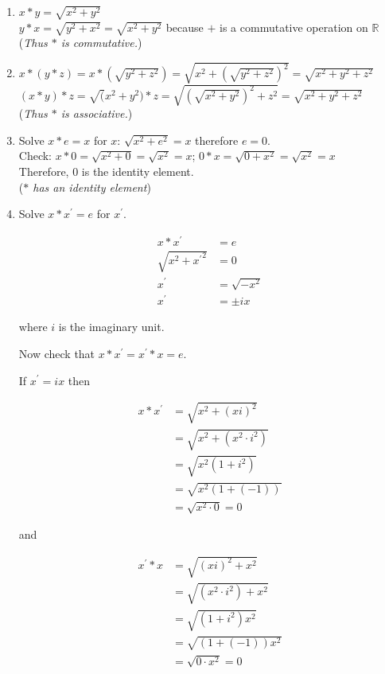 \documentclass[12pt]{article}
\begin{document}
\begin{flushleft}
\begin{enumerate}
\item $x *y = \sqrt{x^2 + y^2}$ \\
 $ y *x = \sqrt{y^2 + x^2} = \sqrt{x^2 + y^2}$ because $+$ is a commutative operation on $\mathbb{R}$ \\
(\textit{Thus $*$ is commutative.})

\item $x * \left( y * z \right) = x *\left(\sqrt{y^2 + z^2} \right) = \sqrt{x^2 + \left(\sqrt{y^2 + z^2} \right)^2} = \sqrt{x^2 + y^2 + z^2}$ \\
$\left( x * y \right) * z = \sqrt( x^2 + y^2 ) * z = \sqrt{\left( \sqrt{x ^2 + y^2} \right)^2 + z^2} = \sqrt{x^2 + y^2 + z^2}$ \\
(\textit{Thus $*$ is associative.})

\item Solve $x*e= x$ for $x$: $\sqrt{x^2 + e^2} = x$ therefore $e = 0$. \\
Check: $x * 0 = \sqrt{x^2 + 0} = \sqrt{x^2} = x$; $0 *x = \sqrt{0 + x^2} = \sqrt{x^2} = x$ \\
Therefore, $0$ is the identity element. \\
(\textit{$*$ has an identity element})

\item Solve $x * x^{'} = e$ for $x^{'}$.

\begin{align*}
x * x^{'} &= e \\
\sqrt{x^2 + {x^{'}}^{2}} &= 0 \\
x^{'} &= \sqrt{-x^2} \\
x^{'} &= \pm ix
\end{align*}

where $i$ is the imaginary unit.

Now check that $x * x^{'} = x^{'} * x = e$. 

If $x^{'} = ix$ then 

\begin{align*}
x * x^{'} &= \sqrt{x^2 + (xi)^2} \\
&= \sqrt{x^2 + (x^2 \cdot i^2)} \\
&= \sqrt{x^2(1+i^2)} \\
&= \sqrt{x^2(1+(-1))} \\
&= \sqrt{x^2 \cdot 0} = 0
\end{align*}

and

\begin{align*}
x^{'} * x &= \sqrt{(xi)^2 + x^2} \\
&= \sqrt{(x^2 \cdot i^2) + x^2} \\
&= \sqrt{(1+i^2)x^2} \\
&= \sqrt{(1+(-1))x^2} \\
&= \sqrt{0 \cdot x^2 } = 0
\end{align*}


\end{enumerate}
\end{flushleft}
\end{document}
